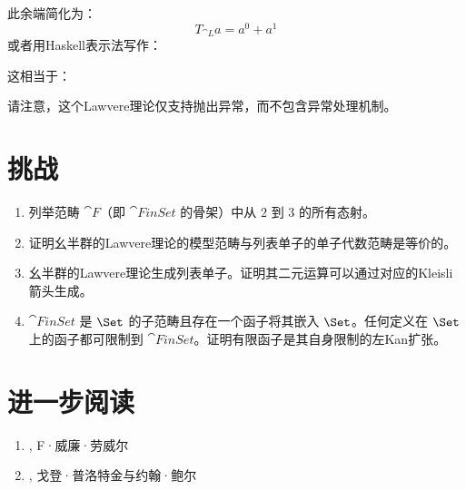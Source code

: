 \begin{figure}[H]
  \centering
\end{figure}

\noindent
此余端简化为：
$$T_{\cat{L}} a = a^0 + a^1$$
或者用Haskell表示法写作：

这相当于：

请注意，这个Lawvere理论仅支持抛出异常，而不包含异常处理机制。

\section{挑战}

\begin{enumerate}
  \tightlist
  \item
        列举范畴 $\cat{F}$（即 $\cat{FinSet}$ 的骨架）中从 $2$ 到 $3$ 的所有态射。
  \item
        证明幺半群的Lawvere理论的模型范畴与列表单子的单子代数范畴是等价的。
  \item
        幺半群的Lawvere理论生成列表单子。证明其二元运算可以通过对应的Kleisli箭头生成。
  \item
        $\cat{FinSet}$ 是 $\Set$ 的子范畴且存在一个函子将其嵌入 $\Set$。任何定义在 $\Set$ 上的函子都可限制到 $\cat{FinSet}$。证明有限函子是其自身限制的左Kan扩张。
\end{enumerate}

\section{进一步阅读}
\begin{enumerate}
  \tightlist
  \item
        , F·威廉·劳威尔
  \item
        , 戈登·普洛特金与约翰·鲍尔
\end{enumerate}